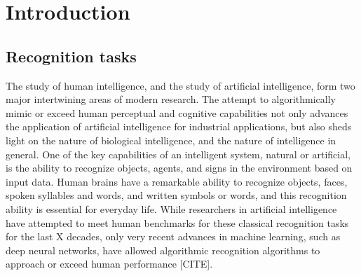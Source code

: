 
\chapter{Introduction} %

\label{Chapter1} %


\newcommand{\keyword}[1]{\textbf{#1}}
\newcommand{\tabhead}[1]{\textbf{#1}}
\newcommand{\code}[1]{\texttt{#1}}
\newcommand{\file}[1]{\texttt{\bfseries#1}}
\newcommand{\option}[1]{\texttt{\itshape#1}}



\section{Recognition tasks}

The study of human intelligence, and the study of artificial
intelligence, form two major intertwining areas of modern research.
The attempt to algorithmically mimic or exceed human perceptual and
cognitive capabilities not only advances the application of artificial
intelligence for industrial applications, but also sheds light on the
nature of biological intelligence, and the nature of intelligence in
general.  One of the key capabilities of an intelligent system,
natural or artificial, is the ability to recognize objects, agents,
and signs in the environment based on input data.  Human brains have a
remarkable ability to recognize objects, faces, spoken syllables and
words, and written symbols or words, and this recognition ability is
essential for everyday life.  While researchers in artificial
intelligence have attempted to meet human benchmarks for these
classical recognition tasks for the last X decades, only very recent
advances in machine learning, such as deep neural networks, have
allowed algorithmic recognition algorithms to approach or exceed human
performance [CITE].

